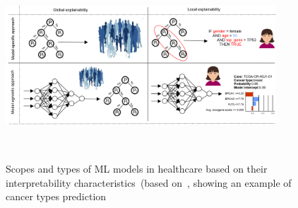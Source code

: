 \begin{figure}[h]
	\centering
	\includegraphics[width=0.9\textwidth,height=70mm]{images/lvg_cancer.png}	
    \caption{Scopes and types of ML models in healthcare based on their interpretability characteristics~(based on~\cite{stiglic2020interpretability}, showing an example of cancer types prediction}	
	\label{fig:local_vs_global_ex}
\end{figure}



